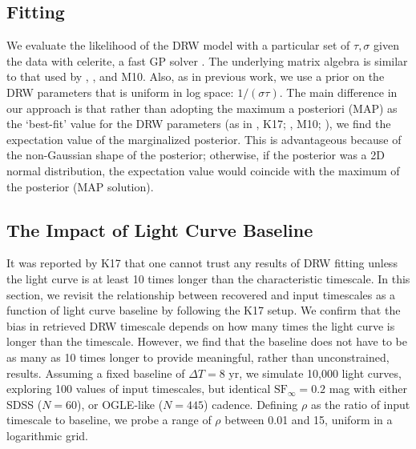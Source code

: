 \documentclass[twocolumn]{aastex62}
\newcommand{\project}[1]{\textsf{#1}}
\begin{document}
\subsection{Fitting}
We evaluate the likelihood of the DRW model with a particular set of $\tau,\sigma$ given the data with \project{celerite}, a fast GP solver \citep{foreman2017}. The underlying matrix algebra is similar to that used by \cite{rybicki1992}, \cite{kozlowski2010}, and M10. Also, as in previous work, we use a prior on the DRW parameters that is  uniform  in log space:  $1 / (\sigma \tau)$. The main difference in our approach is that rather than adopting the maximum a posteriori (MAP) as the `best-fit' value for the DRW parameters (as in \citealt{kozlowski2010}, K17; \citealt{kozlowski2016b}, M10; \citealt{macleod2011}),  we find the expectation value of the marginalized posterior. This is advantageous because of the non-Gaussian shape of the posterior; otherwise, if the posterior was a 2D normal distribution, the expectation value would coincide with the maximum of the posterior (MAP solution). 

\subsection{The Impact of Light Curve Baseline}\label{sec:baseline}

It was reported by K17 that one cannot trust any results of DRW fitting unless the light curve is at least 10 times longer than the characteristic timescale. In this section, we revisit the relationship between recovered and input timescales as a function of light curve baseline by following the K17 setup. We confirm that the bias in retrieved DRW timescale depends on how many times the light curve is longer than the timescale. However, we find that the baseline does not have to be as many as 10 times longer to provide meaningful, rather than unconstrained, results. Assuming a fixed baseline of $\Delta T = 8$ yr, we simulate 10,000 light curves, exploring 100 values of input timescales, but identical $\mathrm{SF}_{\infty}=0.2$ mag with either SDSS ($N=60$), or OGLE-like ($N=445$) cadence. Defining $\rho$ as the ratio of input timescale to baseline, we probe a range of $\rho$ between 0.01 and 15, uniform in a logarithmic grid.
\end{document}
